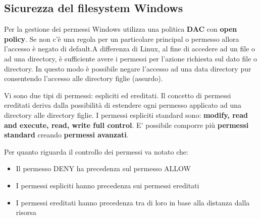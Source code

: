 \subsection{Sicurezza del filesystem Windows}
Per la gestione dei permessi Windows utilizza una politica \textbf{DAC} con \textbf{open policy}. Se non c'è una regola per un particolare principal o permesso allora l'accesso è negato di default.A differenza di Linux, al fine di accedere ad un file o ad una directory, è sufficiente avere i permessi per l’azione richiesta sul dato file o directory. In questo modo è possibile negare l'accesso ad una data directory pur consentendo l'accesso alle directory figlie (assurdo).\newline \newline

Vi sono due tipi di permessi: espliciti ed ereditati. Il concetto di permessi ereditati deriva dalla possibilità di estendere ogni permesso applicato ad una directory alle directory figlie. \newline
I permessi espliciti standard sono: \textbf{modify, read and execute, read, write full control}. E' possibile comporre più \textbf{permessi standard} creando \textbf{permessi avanzati}. \newline \newline

Per quanto riguarda il controllo dei permessi va notato che:
\begin{itemize}
  \item Il permesso DENY ha precedenza sul permesso ALLOW
  \item I permessi espliciti hanno precedenza sui permessi ereditati
  \item I permessi ereditati hanno precedenza tra di loro in base alla distanza dalla risorsa
\end{itemize}
  
